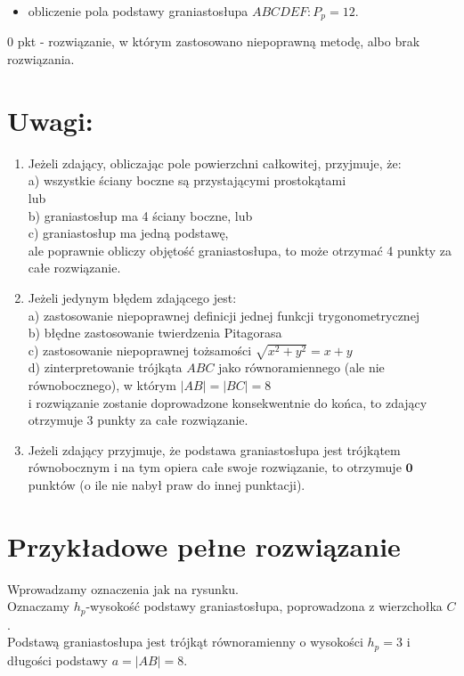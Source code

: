 \documentclass[10pt]{article}
\begin{document}
\begin{itemize}
  \item obliczenie pola podstawy graniastosłupa $A B C D E F: P_{p}=12$.
\end{itemize}

0 pkt - rozwiązanie, w którym zastosowano niepoprawną metodę, albo brak rozwiązania.

\section*{Uwagi:}
\begin{enumerate}
  \item Jeżeli zdający, obliczając pole powierzchni całkowitej, przyjmuje, że:\\
a) wszystkie ściany boczne są przystającymi prostokątami\\
lub\\
b) graniastosłup ma 4 ściany boczne, lub\\
c) graniastosłup ma jedną podstawę,\\
ale poprawnie obliczy objętość graniastosłupa, to może otrzymać 4 punkty za całe rozwiązanie.
  \item Jeżeli jedynym błędem zdającego jest:\\
a) zastosowanie niepoprawnej definicji jednej funkcji trygonometrycznej\\
b) błędne zastosowanie twierdzenia Pitagorasa\\
c) zastosowanie niepoprawnej tożsamości $\sqrt{x^{2}+y^{2}}=x+y$\\
d) zinterpretowanie trójkąta $A B C$ jako równoramiennego (ale nie równobocznego), w którym $|A B|=|B C|=8$\\
i rozwiązanie zostanie doprowadzone konsekwentnie do końca, to zdający otrzymuje 3 punkty za całe rozwiązanie.
  \item Jeżeli zdający przyjmuje, że podstawa graniastosłupa jest trójkątem równobocznym i na tym opiera całe swoje rozwiązanie, to otrzymuje $\mathbf{0}$ punktów (o ile nie nabył praw do innej punktacji).
\end{enumerate}

\section*{Przykładowe pełne rozwiązanie}
Wprowadzamy oznaczenia jak na rysunku.\\
Oznaczamy $h_{p}$-wysokość podstawy graniastosłupa, poprowadzona z wierzchołka $C$.\\
Podstawą graniastosłupa jest trójkąt równoramienny o wysokości $h_{p}=3$ i długości podstawy $a=|A B|=8$.
\end{document}
